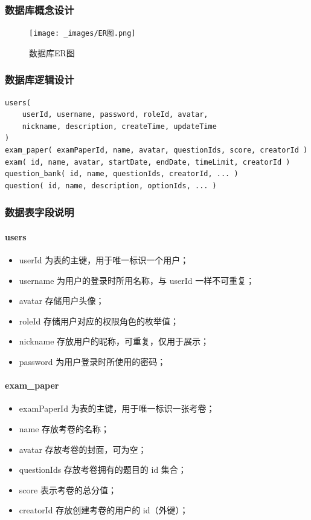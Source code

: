 \subsubsection{数据库概念设计}
\begin{figure}[htb]
    \centering
    \texttt{[image: \_images/ER图.png]}
    \caption{数据库ER图}
\end{figure}

\subsubsection{数据库逻辑设计}
\begin{lstlisting}
users(
    userId, username, password, roleId, avatar,
    nickname, description, createTime, updateTime
)
exam_paper( examPaperId, name, avatar, questionIds, score, creatorId )
exam( id, name, avatar, startDate, endDate, timeLimit, creatorId )
question_bank( id, name, questionIds, creatorId, ... )
question( id, name, description, optionIds, ... )
\end{lstlisting}
\subsubsection{数据表字段说明}
\paragraph{users}
\begin{itemize}
    \item userId 为表的主键，用于唯一标识一个用户；
    \item username 为用户的登录时所用名称，与 userId 一样不可重复；
    \item avatar 存储用户头像；
    \item roleId 存储用户对应的权限角色的枚举值；
    \item nickname 存放用户的昵称，可重复，仅用于展示；
    \item password 为用户登录时所使用的密码；
\end{itemize}
\paragraph{exam\_paper}
\begin{itemize}
    \item examPaperId 为表的主键，用于唯一标识一张考卷；
    \item name 存放考卷的名称；
    \item avatar 存放考卷的封面，可为空；
    \item questionIds 存放考卷拥有的题目的 id 集合；
    \item score 表示考卷的总分值；
    \item creatorId 存放创建考卷的用户的 id（外键）；
\end{itemize}
